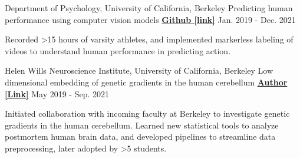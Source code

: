 \begin{cventries}
  \cventry
   	{Department of Psychology, University of California, Berkeley}
    {Predicting human performance using computer vision models} %
    {\href{https://github.com/maedbhk/action_prediction}{\textbf{Github [link]}}}
    {Jan. 2019 - Dec. 2021} %
    {
      \begin{cvitems} %
      	\item {Recorded >15 hours of varsity athletes, and implemented markerless labeling of videos to understand human performance in predicting action.}
      \end{cvitems}
    }
    
  \cventry
    {Helen Wills Neuroscience Institute, University of California, Berkeley} %
    {Low dimensional embedding of genetic gradients in the human cerebellum} %
    {\href{https://papers.ssrn.com/sol3/papers.cfm?abstract_id=3797269}{\textbf{Author [Link]}}}
    {May 2019 - Sep. 2021}
    {
      \begin{cvitems} %
      	\item {Initiated collaboration with incoming faculty at Berkeley to investigate genetic gradients in the human cerebellum. Learned new statistical tools to analyze postmortem human brain data, and developed pipelines to streamline data preprocessing, later adopted by >5 students.}
      \end{cvitems}
    }
  
\end{cventries}
    

